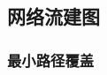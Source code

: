 \documentclass[12pt, a4paper, oneside]{ctexart}
\begin{document}
\subsection{网络流建图} 
\subsubsection{最小路径覆盖} 
\begin{lstlisting}
\end{lstlisting}



\subsection{} 
\begin{lstlisting}
\end{lstlisting}
\end{document}
